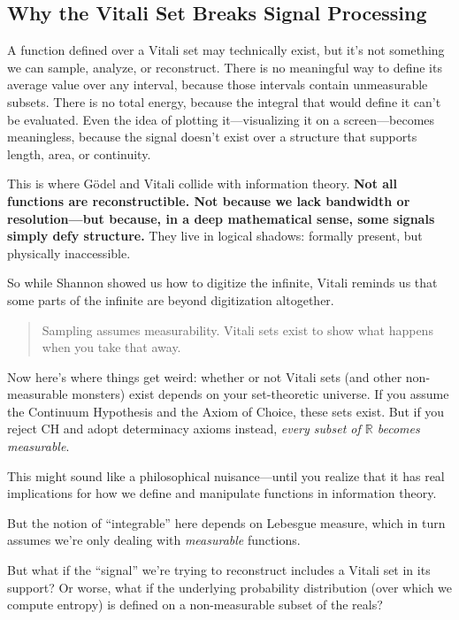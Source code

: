 \vspace{1em}

\subsection{Why the Vitali Set Breaks Signal Processing}

A function defined over a Vitali set may technically exist, but it's not something we can sample, analyze, or reconstruct. There is no meaningful way to define its average value over any interval, because those intervals contain unmeasurable subsets. There is no total energy, because the integral that would define it can't be evaluated. Even the idea of plotting it—visualizing it on a screen—becomes meaningless, because the signal doesn't exist over a structure that supports length, area, or continuity.

This is where Gödel and Vitali collide with information theory. \textbf{Not all functions are reconstructible. Not because we lack bandwidth or resolution—but because, in a deep mathematical sense, some signals simply defy structure.} They live in logical shadows: formally present, but physically inaccessible.

So while Shannon showed us how to digitize the infinite, Vitali reminds us that some parts of the infinite are beyond digitization altogether.

\begin{quote}
Sampling assumes measurability. Vitali sets exist to show what happens when you take that away.
\end{quote}

Now here’s where things get weird: whether or not Vitali sets (and other non-measurable monsters) exist depends on your set-theoretic universe. If you assume the Continuum Hypothesis and the Axiom of Choice, these sets exist. But if you reject CH and adopt determinacy axioms instead, \emph{every subset of \(\mathbb{R}\) becomes measurable}.

This might sound like a philosophical nuisance—until you realize that it has real implications for how we define and manipulate functions in information theory.

But the notion of “integrable” here depends on Lebesgue measure, which in turn assumes we’re only dealing with \emph{measurable} functions.

But what if the “signal” we’re trying to reconstruct includes a Vitali set in its support? Or worse, what if the underlying probability distribution (over which we compute entropy) is defined on a non-measurable subset of the reals?

